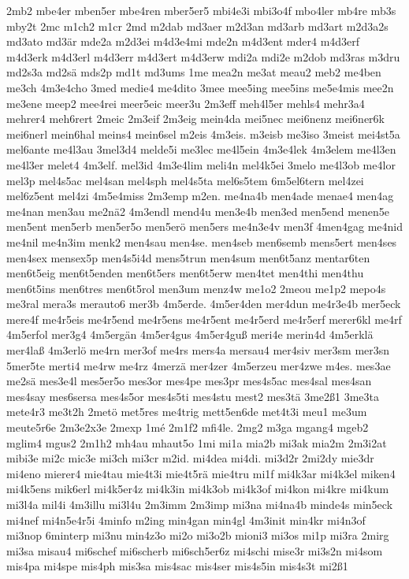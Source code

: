 {2mb2
mbe4er
mben5er
mbe4ren
mber5er5
mbi4e3i
mbi3o4f
mbo4ler
mb4re
mb3s
mby2t
2mc
m1ch2
m1cr
2md
m2dab
md3aer
m2d3an
md3arb
md3art
m2d3a2s
md3ato
md3är
mde2a
m2d3ei
m4d3e4mi
mde2n
m4d3ent
mder4
m4d3erf
m4d3erk
m4d3erl
m4d3err
m4d3ert
m4d3erw
mdi2a
mdi2e
m2dob
md3ras
m3dru
md2s3a
md2sä
mds2p
md1t
md3ums
1me
mea2n
me3at
meau2
meb2
me4ben
me3ch
4m3e4cho
3med
medie4
me4dito
3mee
mee5ing
mee5ins
me5e4mis
mee2n
me3ene
meep2
mee4rei
meer5eic
meer3u
2m3eff
meh4l5er
mehls4
mehr3a4
mehrer4
meh6rert
2meic
2m3eif
2m3eig
mein4da
mei5nec
mei6nenz
mei6ner6k
mei6nerl
mein6hal
meins4
mein6sel
m2eis
4m3eis.
m3eisb
me3iso
3meist
mei4st5a
mel6ante
me4l3au
3mel3d4
melde5i
me3lec
me4l5ein
4m3e4lek
4m3elem
me4l3en
me4l3er
melet4
4m3elf.
mel3id
4m3e4lim
meli4n
mel4k5ei
3melo
me4l3ob
me4lor
mel3p
mel4s5ac
mel4san
mel4sph
mel4s5ta
mel6s5tem
6m5el6tern
mel4zei
mel6z5ent
mel4zi
4m5e4miss
2m3emp
m2en.
me4na4b
men4ade
menae4
men4ag
me4nan
men3au
me2nä2
4m3endl
mend4u
men3e4b
men3ed
men5end
menen5e
men5ent
men5erb
men5er5o
men5erö
men5ers
me4n3e4v
men3f
4men4gag
me4nid
me4nil
me4n3im
menk2
men4sau
men4se.
men4seb
men6semb
mens5ert
men4ses
men4sex
mensex5p
men4s5i4d
mens5trun
men4sum
men6t5anz
mentar6ten
men6t5eig
men6t5enden
men6t5ers
men6t5erw
men4tet
men4thi
men4thu
men6t5ins
men6tres
men6t5rol
men3um
menz4w
me1o2
2meou
me1p2
mepo4s
me3ral
mera3s
merauto6
mer3b
4m5erde.
4m5er4den
mer4dun
me4r3e4b
mer5eck
mere4f
me4r5eis
me4r5end
me4r5ens
me4r5ent
me4r5erd
me4r5erf
merer6kl
me4rf
4m5erfol
mer3g4
4m5ergän
4m5er4gus
4m5er4guß
meri4e
merin4d
4m5erklä
mer4laß
4m3erlö
me4rn
mer3of
me4rs
mers4a
mersau4
mer4siv
mer3sm
mer3sn
5mer5te
merti4
me4rw
me4rz
4merzä
mer4zer
4m5erzeu
mer4zwe
m4es.
mes3ae
me2sä
mes3e4l
mes5er5o
mes3or
mes4pe
mes3pr
mes4s5ac
mes4sal
mes4san
mes4say
mes6sersa
mes4s5or
mes4s5ti
mes4stu
mest2
mes3tä
3me2ß1
3me3ta
mete4r3
me3t2h
2metö
met5res
me4trig
mett5en6de
met4t3i
meu1
me3um
meute5r6e
2m3e2x3e
2mexp
1mé
2m1f2
mfi4le.
2mg2
m3ga
mgang4
mgeb2
mglim4
mgus2
2m1h2
mh4au
mhaut5o
1mi
mi1a
mia2b
mi3ak
mia2m
2m3i2at
mibi3e
mi2c
mic3e
mi3ch
mi3cr
m2id.
mi4dea
mi4di.
mi3d2r
2mi2dy
mie3dr
mi4eno
mierer4
mie4tau
mie4t3i
mie4t5rä
mie4tru
mi1f
mi4k3ar
mi4k3el
miken4
mi4k5ens
mik6erl
mi4k5er4z
mi4k3in
mi4k3ob
mi4k3of
mi4kon
mi4kre
mi4kum
mi3l4a
mil4i
4m3illu
mi3l4u
2m3imm
2m3imp
mi3na
mi4na4b
minde4s
min5eck
mi4nef
mi4n5e4r5i
4minfo
m2ing
min4gan
min4gl
4m3init
min4kr
mi4n3of
mi3nop
6minterp
mi3nu
min4z3o
mi2o
mi3o2b
mioni3
mi3os
mi1p
mi3ra
2mirg
mi3sa
misau4
mi6schef
mi6scherb
mi6sch5er6z
mi4schi
mise3r
mi3s2n
mi4som
mis4pa
mi4spe
mis4ph
mis3sa
mis4sac
mis4ser
mis4s5in
mis4s3t
mi2ß1
}
